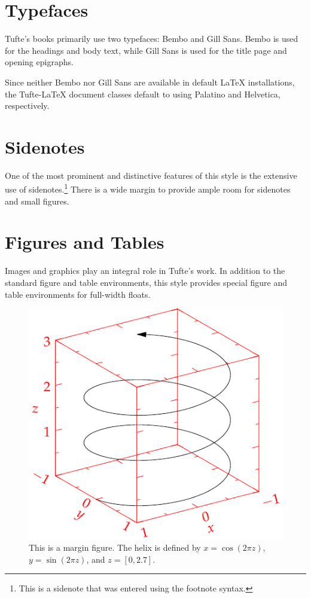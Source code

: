 \documentclass[
  twoside,
  symmetric]{tufte-book}
\begin{document}
\section{Typefaces}\label{typefaces}

Tufte's books primarily use two typefaces: Bembo and Gill Sans. Bembo is
used for the headings and body text, while Gill Sans is used for the
title page and opening epigraphs.

Since neither Bembo nor Gill Sans are available in default LaTeX
installations, the Tufte-LaTeX document classes default to using
Palatino and Helvetica, respectively.

\section{Sidenotes}\label{sidenotes}

One of the most prominent and distinctive features of this style is the
extensive use of sidenotes.\footnote{This is a sidenote that was entered
  using the footnote syntax.} There is a wide margin to provide ample
room for sidenotes and small figures.

\section{Figures and Tables}\label{figures-and-tables}

Images and graphics play an integral role in Tufte's work. In addition
to the standard figure and table environments, this style provides
special figure and table environments for full-width floats.

\begin{figure}[H]

{\centering \includegraphics[width=0.5\linewidth,height=\textheight,keepaspectratio]{style-guide/graphics/helix.pdf}

}

\caption{This is a margin figure. The helix is defined by
\(x = \cos(2\pi z)\), \(y = \sin(2\pi z)\), and \(z = [0, 2.7]\).}

\end{figure}%
\end{document}
